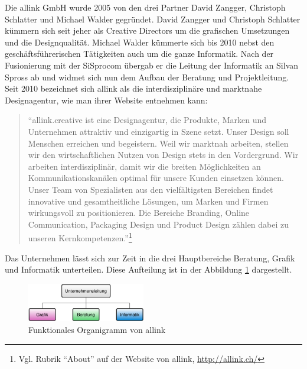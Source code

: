 Die allink GmbH wurde 2005 von den drei Partner David Zangger, Christoph Schlatter
und Michael Walder gegründet. David Zangger und Christoph Schlatter kümmern sich
seit jeher als Creative Directors um die grafischen Umsetzungen und die Designqualität.
Michael Walder kümmerte sich bis 2010 nebst den geschäftsführerischen Tätigkeiten
auch um die ganze Informatik. Nach der Fusionierung mit der SiSprocom übergab
er die Leitung der Informatik an Silvan Spross ab und widmet sich nun dem Aufbau der
Beratung und Projektleitung. Seit 2010 bezeichnet sich allink als die interdisziplinäre 
und marktnahe Designagentur, wie man ihrer Website entnehmen kann:

\begin{quote}
``allink.creative ist eine Designagentur, die Produkte, Marken und Unternehmen 
attraktiv und einzigartig in Szene setzt. Unser Design soll Menschen erreichen 
und begeistern. Weil wir marktnah arbeiten, stellen wir den wirtschaftlichen 
Nutzen von Design stets in den Vordergrund.
Wir arbeiten interdisziplinär, damit wir die breiten Möglichkeiten an 
Kommunikationskanälen optimal für unsere Kunden einsetzen können. Unser 
Team von Spezialisten aus den vielfältigsten Bereichen findet innovative 
und gesamtheitliche Lösungen, um Marken und Firmen wirkungsvoll zu positionieren. 
Die Bereiche Branding, Online Communication, Packaging Design und Product 
Design zählen dabei zu unseren Kernkompetenzen.''\footnote{Vgl. Rubrik ``About'' 
auf der Website von allink, \url{http://allink.ch/}}
\end{quote}

Das Unternehmen lässt sich zur Zeit in die drei Hauptbereiche Beratung, Grafik
und Informatik unterteilen. Diese Aufteilung ist in der Abbildung \ref{pic:04_funktionales_organigramm}
dargestellt.

\begin{figure}[htbp]
\begin{center}
\includegraphics[width=0.46\textwidth,angle=0]{./bilder/analyse/04_funktionales_organigramm.pdf}
\caption[]{Funktionales Organigramm von allink\footnotemark}
\label{pic:04_funktionales_organigramm}
\end{center}
\end{figure}

